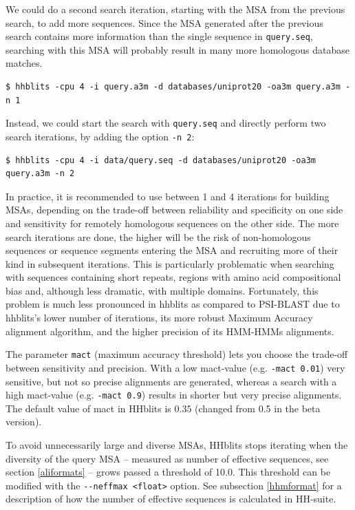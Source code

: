 \documentclass[11pt,a4paper]{article}
\begin{document}
We could do a second search iteration, starting with the MSA from the previous search, to add more sequences. Since the MSA generated after the previous search contains more information than the single sequence in \verb`query.seq`, searching with this MSA will probably result in many more homologous database matches.
\begin{verbatim}
$ hhblits -cpu 4 -i query.a3m -d databases/uniprot20 -oa3m query.a3m -n 1
\end{verbatim}

Instead, we could start the search with \verb`query.seq` and directly perform two search iterations, by adding the option \verb`-n 2`:
\begin{verbatim}
$ hhblits -cpu 4 -i data/query.seq -d databases/uniprot20 -oa3m query.a3m -n 2 
\end{verbatim}

In practice, it is recommended to use between 1 and 4 iterations for building MSAs, depending on the trade-off between reliability and specificity on one side and sensitivity for remotely homologous sequences on the other side. The more search iterations are done, the higher will be the risk of non-homologous sequences or sequence segments entering the MSA and recruiting more of their kind in subsequent iterations. This is particularly problematic when searching with sequences containing short repeats, regions with amino acid compositional bias and, although less dramatic,  with multiple domains. Fortunately, this problem is much less pronounced in hhblits as compared to PSI-BLAST due to hhblits's lower number of iterations, its more robust Maximum Accuracy alignment algorithm, and the higher precision of its HMM-HMMs alignments. 

The parameter \verb`mact` (maximum accuracy threshold) lets you choose the trade-off between sensitivity and 
precision. With a low mact-value (e.g. \verb`-mact 0.01`) very sensitive, but not 
so precise alignments are generated, whereas a search with a high mact-value (e.g. \verb`-mact 0.9`) 
results in shorter but very precise alignments. The default value of mact in HHblits is $0.35$ 
(changed from 0.5 in the beta version). 

To avoid unnecessarily large and diverse MSAs, HHblits stops iterating when the diversity of the query MSA -- measured as number of effective sequences, see section \ref{aliformats} -- grows passed a threshold of 10.0. This threshold can be modified with the \verb`--neffmax <float>` option. See subsection \ref{hhmformat} for a description of how the number of effective sequences is calculated in HH-suite.
\end{document}
